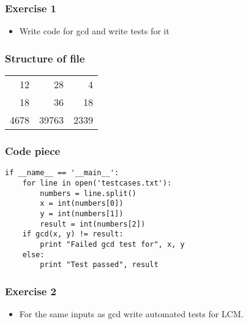 \documentclass[17pt,compress]{beamer}
\begin{document}
\begin{frame}
\frametitle{Exercise 1}
\label{sec-7}

\begin{itemize}
\item Write code for gcd and write tests for it
\end{itemize}
\end{frame}
\begin{frame}
\frametitle{Structure of file}
\label{sec-8}

\begin{center}
\begin{tabular}{rrr}
   12  &     28  &     4  \\
   18  &     36  &    18  \\
 4678  &  39763  &  2339  \\
\end{tabular}
\end{center}

\end{frame}
\begin{frame}[fragile]
\frametitle{Code piece}
\label{sec-9}

\lstset{language=Python}
\begin{footnotesize}
\begin{lstlisting}
if __name__ == '__main__':
    for line in open('testcases.txt'):
        numbers = line.split()
        x = int(numbers[0])
        y = int(numbers[1])
        result = int(numbers[2])
    if gcd(x, y) != result:
        print "Failed gcd test for", x, y
    else:
        print "Test passed", result
\end{lstlisting}
\end{footnotesize}
\end{frame}
\begin{frame}
\frametitle{Exercise 2}
\label{sec-10}

\begin{itemize}
\item For the same inputs as gcd write automated tests for LCM.
\end{itemize}
\end{frame}
\end{document}
